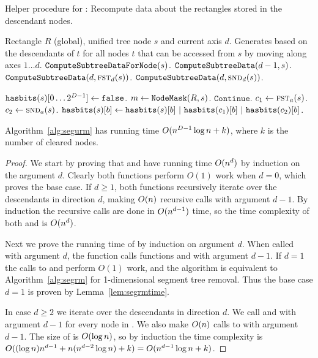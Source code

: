\documentclass[english,gradu]{tktltiki2018}
\begin{document}
\begin{algorithm}
\begin{algorithmic}
\caption{Helper procedure for \cleardt: Recompute data about the rectangles stored in the descendant nodes.}\label{alg:segurm:recomp}
\Require Rectangle $R$ (global), unified tree node $s$ and current axis $d$.
\Ensure Generates  based on the descendants of $t$ for all nodes $t$ that can be accessed from $s$ by moving along axes $1\dots d$.
		\State $\texttt{ComputeSubtreeDataForNode}(s)$.
		\State \Return
		\State \Return
	\EndIf
	\State $\texttt{ComputeSubtreeData}(d-1,s)$.
		\State $\texttt{ComputeSubtreeData}(d,\textsc{fst}_{d}(s))$.
		\State $\texttt{ComputeSubtreeData}(d,\textsc{snd}_{d}(s))$.
	\EndIf
\EndProcedure

	\State $\texttt{hasbits}(s)[0\dots 2^{D-1}]\gets\texttt{false}$.
	\State $m\gets\texttt{NodeMask}(R,s)$.
			\State $\texttt{Continue}$.
		\EndIf
		\State $c_1\gets\textsc{fst}_{a}(s)$.
		\State $c_2\gets\textsc{snd}_{a}(s)$.
				\State $\hasbits{s}{b}\gets \hasbits{s}{b}\ |\ \hasbits{c_1}{b}\ |\ \hasbits{c_2}{b}$.
			\EndIf
		\EndFor
	\EndFor
\EndProcedure
\end{algorithmic}
\end{algorithm}

\begin{lem}\label{lem:segurmtime}Algorithm~\ref{alg:segurm} has running time $O(n^{D-1}\log n + k)$, where $k$ is the number of cleared nodes.\end{lem}
\begin{proof}
We start by proving that \pdst and \recomp have running time $O(n^d)$ by induction on the argument $d$.
Clearly both functions perform $O(1)$ work when $d=0$, which proves the base case.
If $d\ge 1$, both functions recursively iterate over the descendants in direction $d$, making $O(n)$ recursive calls with argument $d-1$.
By induction the recursive calls are done in $O(n^{d-1})$ time, so the time complexity of both \pdst and \recomp is $O(n^d)$.

Next we prove the running time of \cleardt by induction on argument $d$.
When called with argument $d$, the function \cleardt calls functions \pdst and \recomp with argument $d-1$.
If $d=1$ the calls to \pdst and \recomp perform $O(1)$ work, and the algorithm is equivalent to Algorithm~\ref{alg:segrm} for 1-dimensional segment tree removal.
Thus the base case $d=1$ is proven by Lemma~\ref{lem:segrmtime}.

In case $d\ge 2$ we iterate over the descendants in direction $d$.
We call \pdst and \recomp with argument $d-1$ for every node in .
We also make $O(n)$ calls to \cleardt with argument $d-1$.
The size of  is $O(\log n)$, so by induction the time complexity is $O((\log n)n^{d-1} + n(n^{d-2}\log n) + k)=O(n^{d-1}\log n + k)$.
\end{proof}
\end{document}
